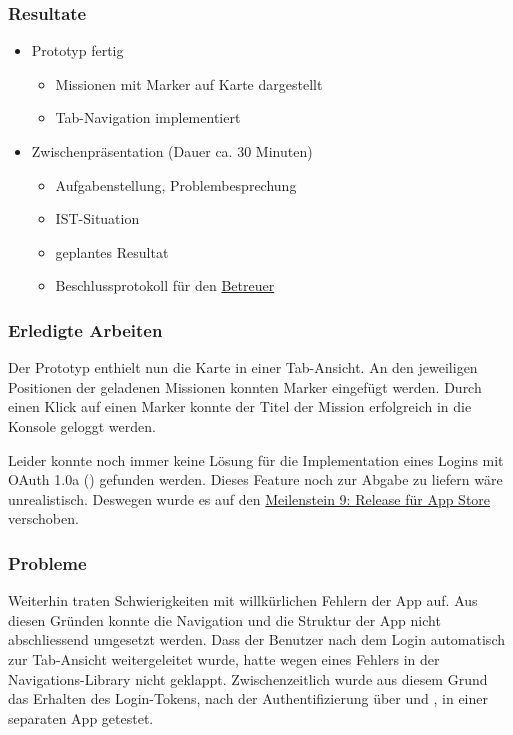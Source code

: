 \subsubsection{Resultate}
\begin{itemize}
	\item {} Prototyp fertig
	\begin{itemize}
		\item Missionen mit Marker auf Karte dargestellt
		\item Tab-Navigation implementiert
	\end{itemize}
	\item Zwischenpräsentation (Dauer ca. 30 Minuten)
	\begin{itemize}
		\item Aufgabenstellung, Problembesprechung
		\item IST-Situation
		\item geplantes Resultat
		\item Beschlussprotokoll für den \hyperref[pm-team]{Betreuer}
	\end{itemize}
\end{itemize}

\subsubsection{Erledigte Arbeiten}
Der Prototyp enthielt nun die Karte in einer Tab-Ansicht. 
An den jeweiligen Positionen der geladenen Missionen konnten Marker eingefügt werden.
Durch einen Klick auf einen Marker konnte der Titel der Mission erfolgreich in die Konsole geloggt werden.

Leider konnte noch immer keine Lösung für die Implementation eines Logins mit \gls{OAuth} 1.0a () gefunden werden.
Dieses Feature noch zur Abgabe zu liefern wäre unrealistisch.
Deswegen wurde es auf den \hyperref[pm-ms9]{Meilenstein 9: Release für App Store} verschoben.

\subsubsection{Probleme}
Weiterhin traten Schwierigkeiten mit willkürlichen Fehlern der  App auf. 
Aus diesen Gründen konnte die Navigation und die Struktur der App nicht abschliessend umgesetzt werden.
Dass der Benutzer nach dem Login automatisch zur Tab-Ansicht weitergeleitet wurde, hatte wegen eines Fehlers in der Navigations-\gls{Library} nicht geklappt.
Zwischenzeitlich wurde aus diesem Grund das Erhalten des Login-Tokens, nach der Authentifizierung über  und , in einer separaten App getestet.


